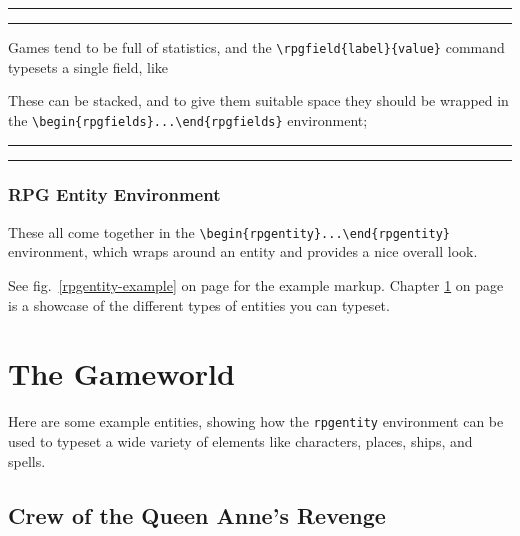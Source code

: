 \rpgvskip
\hrule
\rpgvskip
{}
\rpgvskip
\hrule
\rpgvskip

Games tend to be full of statistics, and the \verb|\rpgfield{label}{value}| command typesets a single field, like

These can be stacked, and to give them suitable space they should be wrapped in the \verb|\begin{rpgfields}...\end{rpgfields}| environment;

\rpgvskip
\hrule
\begin{rpgfields}
\end{rpgfields}
\hrule
\rpgvskip

\subsection{RPG Entity Environment}

These all come together in the \verb|\begin{rpgentity}...\end{rpgentity}| environment, which wraps around an entity and provides a nice overall look.

See fig.~\ref{rpgentity-example} on page \pageref{rpgentity-example} for the example markup. Chapter \ref{gameworld} on page \pageref{gameworld} is a showcase of the different types of entities you can typeset.

\begin{figure*}[h]
    \label{rpgentity-example}
    
    \caption{The markup for the example entity.}
\end{figure*}

\chapter{The Gameworld}\label{gameworld}

Here are some example entities, showing how the \texttt{rpgentity} environment can be used to typeset a wide variety of elements like characters, places, ships, and spells.

\section{Crew of the Queen Anne's Revenge}


